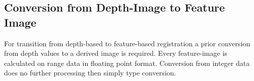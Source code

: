 \subsection{Conversion from Depth-Image to Feature Image}

For transition from depth-based to feature-based registration a prior conversion from depth values to a derived image is required.
Every feature-image is calculated on range data in floating point format.
Conversion from integer data does no further processing then simply type conversion.






